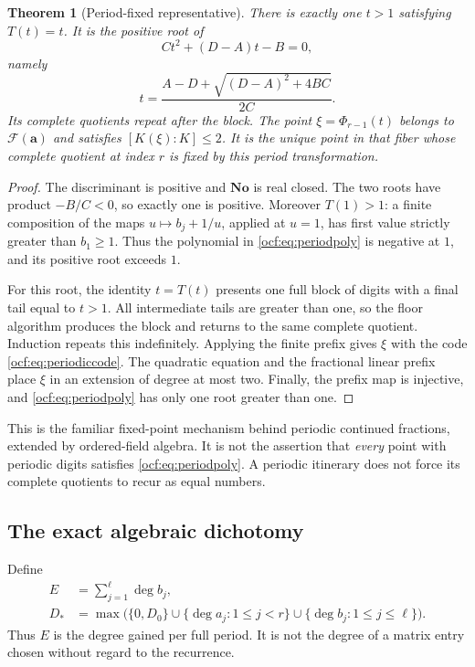 \documentclass[11pt,a4paper]{article}
\numberwithin{equation}{section}
\newtheorem{theorem}{Theorem}[section]
\theoremstyle{definition}
\theoremstyle{remark}
\newcommand{\No}{\mathbf{No}}
\newcommand{\F}{\mathcal F}
\newcommand{\dgr}{\operatorname{deg}}
\newcommand{\codea}{\boldsymbol a}
\begin{document}
\begin{theorem}[Period-fixed representative]\label{ocf:thm:periodroot}
There is exactly one $t>1$ satisfying $T(t)=t$. It is the positive root of
\begin{equation}\label{ocf:eq:periodpoly}
 Ct^2+(D-A)t-B=0,
\end{equation}
namely
\begin{equation}\label{ocf:eq:periodroot}
 t=\frac{A-D+\sqrt{(D-A)^2+4BC}}{2C}.
\end{equation}
Its complete quotients repeat after the block. The point
$\xi=\Phi_{r-1}(t)$ belongs to $\F(\codea)$ and satisfies $[K(\xi):K]\le2$.
It is the unique point in that fiber whose complete quotient at index $r$
is fixed by this period transformation.
\end{theorem}
\begin{proof}
The discriminant is positive and $\No$ is real closed. The two roots have
product $-B/C<0$, so exactly one is positive. Moreover $T(1)>1$: a finite
composition of the maps $u\mapsto b_j+1/u$, applied at $u=1$, has first
value strictly greater than $b_1\ge1$. Thus the polynomial in
\eqref{ocf:eq:periodpoly} is negative at $1$, and its positive root exceeds
$1$.

For this root, the identity $t=T(t)$ presents one full block of digits
with a final tail equal to $t>1$. All intermediate tails are greater than
one, so the floor algorithm produces the block and returns to the same
complete quotient. Induction repeats this indefinitely. Applying the
finite prefix gives $\xi$ with the code \eqref{ocf:eq:periodiccode}. The
quadratic equation and the fractional linear prefix place $\xi$ in an
extension of degree at most two. Finally, the prefix map is injective,
and \eqref{ocf:eq:periodpoly} has only one root greater than one.
\end{proof}

This is the familiar fixed-point mechanism behind periodic continued
fractions, extended by ordered-field algebra. It is not the assertion
that \emph{every} point with periodic digits satisfies
\eqref{ocf:eq:periodpoly}. A periodic itinerary does not force its complete
quotients to recur as equal numbers.

\subsection{The exact algebraic dichotomy}

Define
\begin{equation}\label{ocf:eq:periodscales}
\begin{split}
 E&=\sum_{j=1}^{\ell}\dgr b_j,\\
 D_*&=\max\bigl(\{0,D_0\}\cup
 \{\dgr a_j:1\le j<r\}\cup\{\dgr b_j:1\le j\le\ell\}\bigr).
\end{split}
\end{equation}
Thus $E$ is the degree gained per full period. It is not the degree of a
matrix entry chosen without regard to the recurrence.
\end{document}
